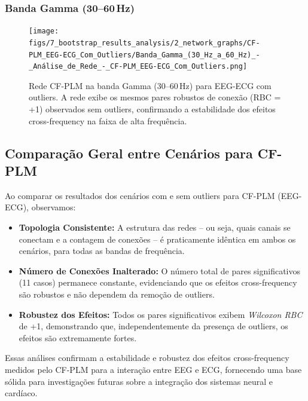 \subsubsection{\texorpdfstring{Banda Gamma (30--60\,Hz)}{Banda Gamma (30-60 Hz)}}
\begin{figure}[htb]
  \centering
  \texttt{[image: figs/7\_bootstrap\_results\_analysis/2\_network\_graphs/CF-PLM\_EEG-ECG\_Com\_Outliers/Banda\_Gamma\_(30\_Hz\_a\_60\_Hz)\_-\_Análise\_de\_Rede\_-\_CF-PLM\_EEG-ECG\_Com\_Outliers.png]}
  \caption{Rede CF-PLM na banda Gamma (30--60\,Hz) para EEG-ECG com outliers. A rede exibe os mesmos pares robustos de conexão (RBC = +1) observados sem outliers, confirmando a estabilidade dos efeitos cross-frequency na faixa de alta frequência.}
  \label{fig:rede_cfplm_gamma_com}
\end{figure}

\subsection{Comparação Geral entre Cenários para CF-PLM}
Ao comparar os resultados dos cenários com e sem outliers para CF-PLM (EEG-ECG), observamos:
\begin{itemize}
    \item \textbf{Topologia Consistente:} A estrutura das redes – ou seja, quais canais se conectam e a contagem de conexões – é praticamente idêntica em ambos os cenários, para todas as bandas de frequência.
    \item \textbf{Número de Conexões Inalterado:} O número total de pares significativos (11 casos) permanece constante, evidenciando que os efeitos cross-frequency são robustos e não dependem da remoção de outliers.
    \item \textbf{Robustez dos Efeitos:} Todos os pares significativos exibem \emph{Wilcoxon RBC} de +1, demonstrando que, independentemente da presença de outliers, os efeitos são extremamente fortes.
\end{itemize}

Essas análises confirmam a estabilidade e robustez dos efeitos cross-frequency medidos pelo CF-PLM para a interação entre EEG e ECG, fornecendo uma base sólida para investigações futuras sobre a integração dos sistemas neural e cardíaco.